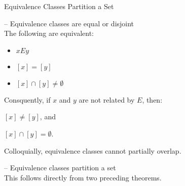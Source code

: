\begin{slide}[bm=,toc=]{Equivalence Classes Partition a Set}
\begin{thm}{ -- Equivalence classes are equal or disjoint}~\\
\pause
The following are equivalent:
\begin{itemize}
\item<3-> $xEy$ 
\item<4-> $[x] = [y]$ 
\item<5-> $[x] \cap [y] \neq \emptyset$ 
\end{itemize}
\pause[4]
Consquently, if $x$ and $y$ are not related by $E$, then:
\item<7->$[x] \neq [y]$, and
\item<8->$[x] \cap [y] = \emptyset$.
\end{thm}
\pause[3]
Colloquially, equivalence classes cannot partially overlap. 
\pause
\vspace{5mm}
\begin{thm}{ -- Equivalence classes partition a set}~\\
\pause
This follows directly from two preceding theorems. 
\end{thm}
\end{slide}


